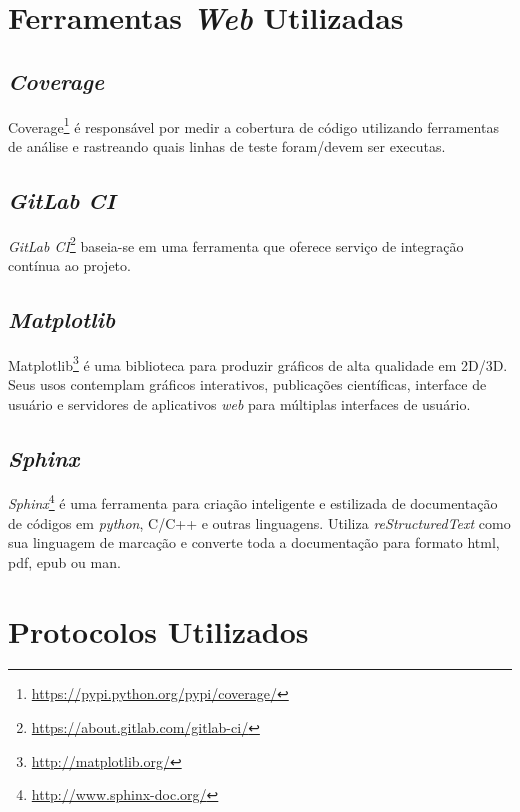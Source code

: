 \section{Ferramentas \textit{Web} Utilizadas}
    \subsection{\textit{Coverage}}
    Coverage\footnote{\url{https://pypi.python.org/pypi/coverage/}} é responsável por medir a cobertura de código utilizando ferramentas de análise e rastreando quais
    linhas de teste foram/devem ser executas.

    \subsection{\textit{GitLab CI}}
    \textit{GitLab CI}\footnote{\url{https://about.gitlab.com/gitlab-ci/}} baseia-se em uma ferramenta que oferece serviço de integração contínua ao projeto.

    \subsection{\textit{Matplotlib}}
    Matplotlib\footnote{\url{http://matplotlib.org/}} é uma biblioteca para produzir gráficos de alta qualidade em 2D/3D. Seus usos contemplam gráficos interativos, publicações científicas, interface de usuário e servidores de aplicativos \textit{web} para múltiplas interfaces de usuário.

    \subsection{\textit{Sphinx}}
    \textit{Sphinx}\footnote{\url{http://www.sphinx-doc.org/}} é uma ferramenta para criação inteligente e estilizada de documentação de códigos em \textit{python}, C/C++
    e outras linguagens. Utiliza \textit{reStructuredText} como sua linguagem de marcação e converte toda a documentação para formato html, pdf, epub ou man.

\section{Protocolos Utilizados}
